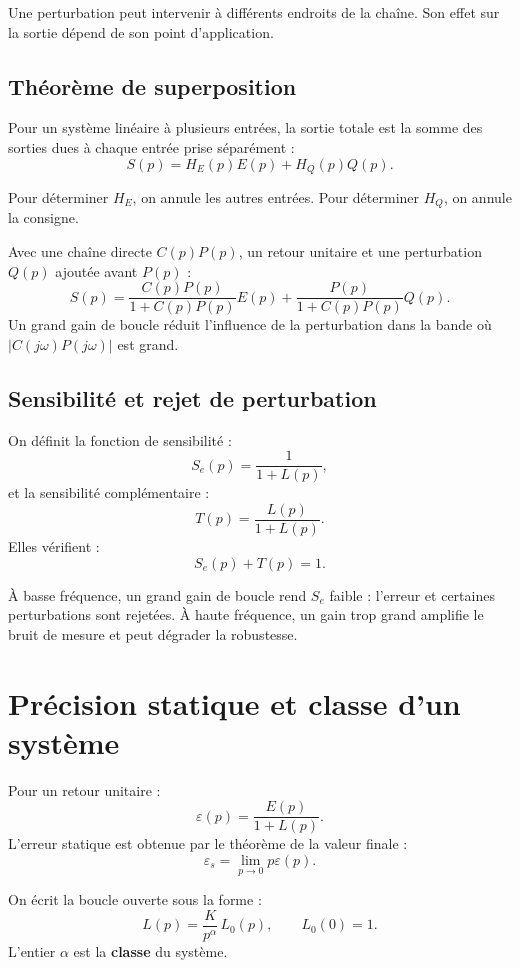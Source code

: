 \TLSchemaPerturbe

Une perturbation peut intervenir à différents endroits de la chaîne. Son effet sur la sortie dépend de son point d'application.

\subsection{Théorème de superposition}

Pour un système linéaire à plusieurs entrées, la sortie totale est la somme des sorties dues à chaque entrée prise séparément :
\[
S(p)=H_E(p)E(p)+H_Q(p)Q(p).
\]

Pour déterminer $H_E$, on annule les autres entrées. Pour déterminer $H_Q$, on annule la consigne.

\begin{SAapplication}[title={Perturbation appliquée à l'entrée du procédé}]
Avec une chaîne directe $C(p)P(p)$, un retour unitaire et une perturbation $Q(p)$ ajoutée avant $P(p)$ :
\[
S(p)=\frac{C(p)P(p)}{1+C(p)P(p)}E(p)
+\frac{P(p)}{1+C(p)P(p)}Q(p).
\]
Un grand gain de boucle réduit l'influence de la perturbation dans la bande où $|C(j\omega)P(j\omega)|$ est grand.
\end{SAapplication}

\subsection{Sensibilité et rejet de perturbation}

On définit la fonction de sensibilité :
\[
S_e(p)=\frac{1}{1+L(p)},
\]
et la sensibilité complémentaire :
\[
T(p)=\frac{L(p)}{1+L(p)}.
\]
Elles vérifient :
\[
S_e(p)+T(p)=1.
\]

À basse fréquence, un grand gain de boucle rend $S_e$ faible : l'erreur et certaines perturbations sont rejetées. À haute fréquence, un gain trop grand amplifie le bruit de mesure et peut dégrader la robustesse.

\section{Précision statique et classe d'un système}\label{sec:sa-precision-statique}

Pour un retour unitaire :
\[
\varepsilon(p)=\frac{E(p)}{1+L(p)}.
\]
L'erreur statique est obtenue par le théorème de la valeur finale :
\[
\varepsilon_s=\lim_{p\to0}p\varepsilon(p).
\]

On écrit la boucle ouverte sous la forme :
\[
L(p)=\frac{K}{p^\alpha}\,L_0(p),\qquad L_0(0)=1.
\]
L'entier $\alpha$ est la \textbf{classe} du système.

